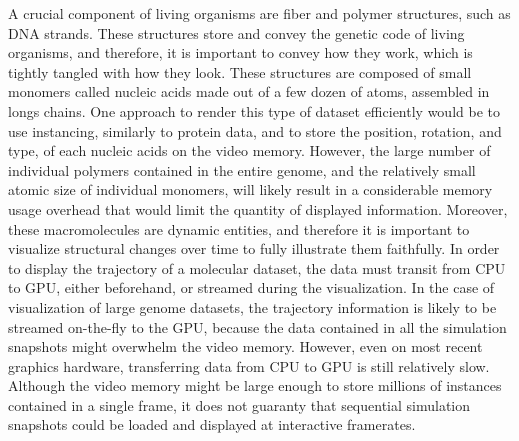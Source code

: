 % 

A crucial component of living organisms are fiber and polymer structures, such as DNA strands.
These structures store and convey the genetic code of living organisms, and therefore, it is important to convey how they work, which is tightly tangled with how they look.
These structures are composed of small monomers called nucleic acids made out of a few dozen of atoms, assembled in longs chains.
One approach to render this type of dataset efficiently would be to use instancing, similarly to protein data, and to store the position, rotation, and type, of each nucleic acids on the video memory.
However, the large number of individual polymers contained in the entire genome, and the relatively small atomic size of individual monomers, will likely result in a considerable memory usage overhead that would limit the quantity of displayed information.
%
Moreover, these macromolecules are dynamic entities, and therefore it is important to visualize structural changes over time to fully illustrate them faithfully.
In order to display the trajectory of a molecular dataset, the data must transit from CPU to GPU, either beforehand, or streamed during the visualization.
In the case of visualization of large genome datasets, the trajectory information is likely to be streamed on-the-fly to the GPU, because the data contained in all the simulation snapshots might overwhelm the video memory.
However, even on most recent graphics hardware, transferring data from CPU to GPU is still relatively slow.
Although the video memory might be large enough to store millions of instances contained in a single frame, it does not guaranty that sequential simulation snapshots could be loaded and displayed at interactive framerates.

